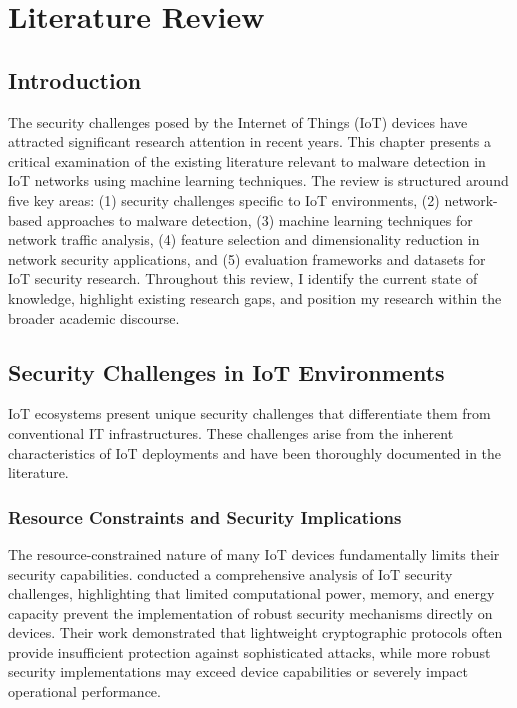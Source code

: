 \chapter{Literature Review}

\section{Introduction}

The security challenges posed by the Internet of Things (IoT) devices have attracted significant research attention in recent years. This chapter presents a critical examination of the existing literature relevant to malware detection in IoT networks using machine learning techniques. The review is structured around five key areas: (1) security challenges specific to IoT environments, (2) network-based approaches to malware detection, (3) machine learning techniques for network traffic analysis, (4) feature selection and dimensionality reduction in network security applications, and (5) evaluation frameworks and datasets for IoT security research. Throughout this review, I identify the current state of knowledge, highlight existing research gaps, and position my research within the broader academic discourse.

\section{Security Challenges in IoT Environments}

IoT ecosystems present unique security challenges that differentiate them from conventional IT infrastructures. These challenges arise from the inherent characteristics of IoT deployments and have been thoroughly documented in the literature.

\subsection{Resource Constraints and Security Implications}

The resource-constrained nature of many IoT devices fundamentally limits their security capabilities. \cite{Bertino2017} conducted a comprehensive analysis of IoT security challenges, highlighting that limited computational power, memory, and energy capacity prevent the implementation of robust security mechanisms directly on devices. Their work demonstrated that lightweight cryptographic protocols often provide insufficient protection against sophisticated attacks, while more robust security implementations may exceed device capabilities or severely impact operational performance.

